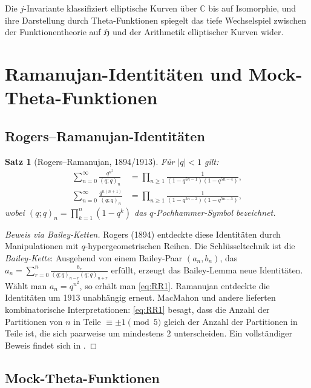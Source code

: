 \documentclass[12pt,a4paper]{amsart}
\newtheorem{theorem}{Satz}[section]
\theoremstyle{definition}
\begin{document}
Die $j$-Invariante klassifiziert elliptische Kurven über $\mathbb{C}$ bis auf
Isomorphie, und ihre Darstellung durch Theta-Funktionen spiegelt das tiefe
Wechselspiel zwischen der Funktionentheorie auf $\mathfrak{H}$ und der Arithmetik
elliptischer Kurven wider.

\section{Ramanujan-Identitäten und Mock-Theta-Funktionen}\label{sec:ramanujan}

\subsection{Rogers--Ramanujan-Identitäten}

\begin{theorem}[Rogers--Ramanujan, 1894/1913]\label{thm:RR}
Für $|q| < 1$ gilt:
\begin{align}
  \sum_{n=0}^{\infty} \frac{q^{n^2}}{(q;q)_n}
  &= \prod_{n\geq1}\frac{1}{(1-q^{5n-1})(1-q^{5n-4})},
  \label{eq:RR1}\\
  \sum_{n=0}^{\infty} \frac{q^{n(n+1)}}{(q;q)_n}
  &= \prod_{n\geq1}\frac{1}{(1-q^{5n-2})(1-q^{5n-3})},
  \label{eq:RR2}
\end{align}
wobei $(q;q)_n = \prod_{k=1}^n(1-q^k)$ das $q$-Pochhammer-Symbol bezeichnet.
\end{theorem}

\begin{proof}[Beweis via Bailey-Ketten]
Rogers (1894) entdeckte diese Identitäten durch Manipulationen mit $q$-hypergeometrischen Reihen.
Die Schlüsseltechnik ist die \emph{Bailey-Kette}: Ausgehend von einem Bailey-Paar $(a_n, b_n)$,
das $a_n = \sum_{r=0}^n \frac{b_r}{(q;q)_{n-r}(q;q)_{n+r}}$ erfüllt,
erzeugt das Bailey-Lemma neue Identitäten.
Wählt man $a_n = q^{n^2}$, so erhält man \eqref{eq:RR1}.
Ramanujan entdeckte die Identitäten um 1913 unabhängig erneut.
MacMahon und andere lieferten kombinatorische Interpretationen:
\eqref{eq:RR1} besagt, dass die Anzahl der Partitionen von $n$ in Teile
$\equiv \pm 1 \pmod{5}$ gleich der Anzahl der Partitionen in Teile ist,
die sich paarweise um mindestens $2$ unterscheiden.
Ein vollständiger Beweis findet sich in \cite{Andrews1998}.
\end{proof}

\subsection{Mock-Theta-Funktionen}
\end{document}
